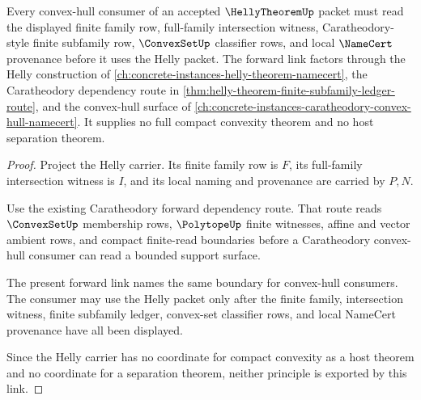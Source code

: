 \begin{theorem}
\label{thm:helly-theorem-convex-hull-forward-link}
Every convex-hull consumer of an accepted $\HellyTheoremUp$ packet must read the displayed finite family row, full-family intersection witness, Caratheodory-style finite subfamily row, $\ConvexSetUp$ classifier rows, and local $\NameCert$ provenance before it uses the Helly packet. The forward link factors through the Helly construction of \autoref{ch:concrete-instances-helly-theorem-namecert}, the Caratheodory dependency route in \autoref{thm:helly-theorem-finite-subfamily-ledger-route}, and the convex-hull surface of \autoref{ch:concrete-instances-caratheodory-convex-hull-namecert}. It supplies no full compact convexity theorem and no host separation theorem.
\end{theorem}
\begin{proof}
Project the Helly carrier. Its finite family row is $F$, its full-family intersection witness is $I$, and its local naming and provenance are carried by $P,N$.

Use the existing Caratheodory forward dependency route. That route reads $\ConvexSetUp$ membership rows, $\PolytopeUp$ finite witnesses, affine and vector ambient rows, and compact finite-read boundaries before a Caratheodory convex-hull consumer can read a bounded support surface.

The present forward link names the same boundary for convex-hull consumers. The consumer may use the Helly packet only after the finite family, intersection witness, finite subfamily ledger, convex-set classifier rows, and local NameCert provenance have all been displayed.

Since the Helly carrier has no coordinate for compact convexity as a host theorem and no coordinate for a separation theorem, neither principle is exported by this link.
\end{proof}

